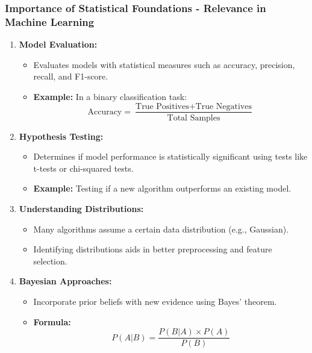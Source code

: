 \documentclass{beamer}
\begin{document}
\begin{frame}[fragile]
    \frametitle{Importance of Statistical Foundations - Relevance in Machine Learning}
    \begin{enumerate}
        \item \textbf{Model Evaluation:}
        \begin{itemize}
            \item Evaluates models with statistical measures such as accuracy, precision, recall, and F1-score.
            \item \textbf{Example:} In a binary classification task:
            \[
            \text{Accuracy} = \frac{\text{True Positives} + \text{True Negatives}}{\text{Total Samples}}
            \]
        \end{itemize}

        \item \textbf{Hypothesis Testing:}
        \begin{itemize}
            \item Determines if model performance is statistically significant using tests like t-tests or chi-squared tests.
            \item \textbf{Example:} Testing if a new algorithm outperforms an existing model.
        \end{itemize}

        \item \textbf{Understanding Distributions:}
        \begin{itemize}
            \item Many algorithms assume a certain data distribution (e.g., Gaussian).
            \item Identifying distributions aids in better preprocessing and feature selection.
        \end{itemize}

        \item \textbf{Bayesian Approaches:}
        \begin{itemize}
            \item Incorporate prior beliefs with new evidence using Bayes' theorem.
            \item \textbf{Formula:}
            \[
            P(A|B) = \frac{P(B|A) \times P(A)}{P(B)}
            \]
        \end{itemize}
    \end{enumerate}
\end{frame}
\end{document}
